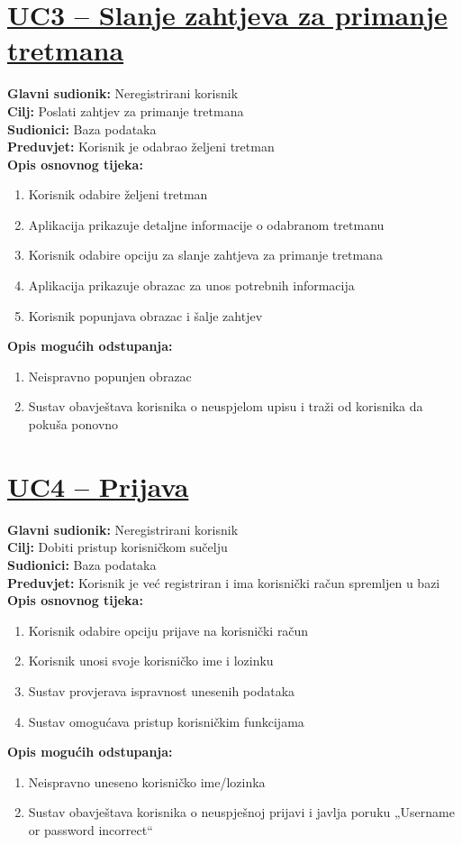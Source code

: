 \documentclass{article}
\begin{document}
	\section*{\underline{UC3 – Slanje zahtjeva za primanje tretmana}}
	\textbf{Glavni sudionik:} Neregistrirani korisnik \\
	\textbf{Cilj:} Poslati zahtjev za primanje tretmana \\
	\textbf{Sudionici:} Baza podataka \\
	\textbf{Preduvjet:} Korisnik je odabrao željeni tretman \\
	\textbf{Opis osnovnog tijeka:}
	\begin{enumerate}
		\item Korisnik odabire željeni tretman
		\item Aplikacija prikazuje detaljne informacije o odabranom tretmanu
		\item Korisnik odabire opciju za slanje zahtjeva za primanje tretmana
		\item Aplikacija prikazuje obrazac za unos potrebnih informacija
		\item Korisnik popunjava obrazac i šalje zahtjev
	\end{enumerate}
	\textbf{Opis mogućih odstupanja:}
	\begin{enumerate}
		\item Neispravno popunjen obrazac
		\item Sustav obavještava korisnika o neuspjelom upisu i traži od korisnika da pokuša ponovno
	\end{enumerate}
	
	\section*{\underline{UC4 – Prijava}}
	\textbf{Glavni sudionik:} Neregistrirani korisnik \\
	\textbf{Cilj:} Dobiti pristup korisničkom sučelju \\
	\textbf{Sudionici:} Baza podataka \\
	\textbf{Preduvjet:} Korisnik je već registriran i ima korisnički račun spremljen u bazi \\
	\textbf{Opis osnovnog tijeka:}
	\begin{enumerate}
		\item Korisnik odabire opciju prijave na korisnički račun
		\item Korisnik unosi svoje korisničko ime i lozinku
		\item Sustav provjerava ispravnost unesenih podataka
		\item Sustav omogućava pristup korisničkim funkcijama
	\end{enumerate}
	\textbf{Opis mogućih odstupanja:}
	\begin{enumerate}
		\item Neispravno uneseno korisničko ime/lozinka
		\item Sustav obavještava korisnika o neuspješnoj prijavi i javlja poruku „Username or password incorrect“
	\end{enumerate}
	
\end{document}
